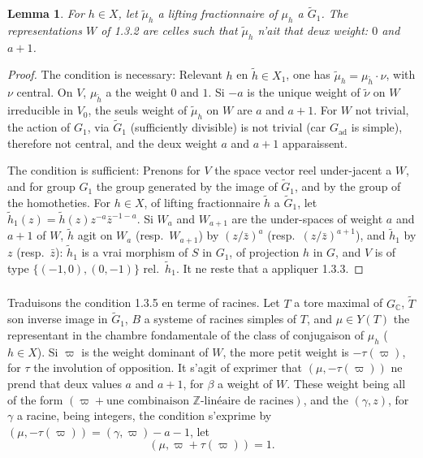 \documentclass[12pt,a4paper]{article}
\theoremstyle{plain}
\newtheorem{lemma}[theorem]{Lemma}
\theoremstyle{definition}
\theoremstyle{remark}
\newcommand{\ZZ}{\mathbb{Z}}
\newcommand{\CC}{\mathbb{C}}
\begin{document}
\begin{lemma}
For $h \in X$, let $\tilde{\mu}_h$ a lifting fractionnaire of $\mu_h$ a $\tilde{G}_1$. The representations $W$ of 1.3.2 are celles such that $\tilde{\mu}_h$ n'ait that deux weight: $0$ and $a+1$.
\end{lemma}

\begin{proof}
The condition is necessary: Relevant $h$ en $\tilde{h} \in X_1$, one has $\tilde{\mu}_h = \mu_{\tilde{h}} \cdot \nu$, with $\nu$ central. On $V$, $\mu_{\tilde{h}}$ a the weight $0$ and $1$. Si $-a$ is the unique weight of $\tilde{\nu}$ on $W$ irreducible in $V_0$, the seuls weight of $\tilde{\mu}_h$ on $W$ are $a$ and $a+1$. For $W$ not trivial, the action of $G_1$, via $\tilde{G}_1$ (sufficiently divisible) is not trivial (car $G_{\text{ad}}$ is simple), therefore not central, and the deux weight $a$ and $a+1$ apparaissent.

The condition is sufficient: Prenons for $V$ the space vector reel under-jacent a $W$, and for group $G_1$ the group generated by the image of $\tilde{G}_1$, and by the group of the homotheties. For $h \in X$, of lifting fractionnaire $\tilde{h}$ a $\tilde{G}_1$, let $\tilde{h}_1(z) = \tilde{h}(z)z^{-a}\bar{z}^{-1-a}$. Si $W_a$ and $W_{a+1}$ are the under-spaces of weight $a$ and $a+1$ of $W$, $\tilde{h}$ agit on $W_a$ (resp.~$W_{a+1}$) by $(z/\bar{z})^a$ (resp.~$(z/\bar{z})^{a+1}$), and $\tilde{h}_1$ by $z$ (resp.~$\bar{z}$): $\tilde{h}_1$ is a vrai morphism of $S$ in $G_1$, of projection $h$ in $G$, and $V$ is of type $\{(-1,0),(0,-1)\}$ rel.~$\tilde{h}_1$. It ne reste that a appliquer 1.3.3.
\end{proof}

\subsubsection{}

Traduisons the condition 1.3.5 en terme of racines. Let $T$ a tore maximal of $G_{\CC}$, $\tilde{T}$ son inverse image in $\tilde{G}_1$, $B$ a systeme of racines simples of $T$, and $\mu \in Y(T)$ the representant in the chambre fondamentale of the class of conjugaison of $\mu_h$ ($h \in X$). Si $\varpi$ is the weight dominant of $W$, the more petit weight is $-\tau(\varpi)$, for $\tau$ the involution of opposition. It s'agit of exprimer that $(\mu,-\tau(\varpi))$ ne prend that deux values $a$ and $a+1$, for $\beta$ a weight of $W$. These weight being all of the form $(\varpi + \text{une combinaison }\ZZ\text{-lin\'eaire de racines})$, and the $(\gamma,z)$, for $\gamma$ a racine, being integers, the condition s'exprime by $(\mu,-\tau(\varpi)) = (\gamma,\varpi) - a - 1$, let
\begin{equation}\label{eq:1.3.6.1}
(\mu, \varpi + \tau(\varpi)) = 1.
\end{equation}
\end{document}
